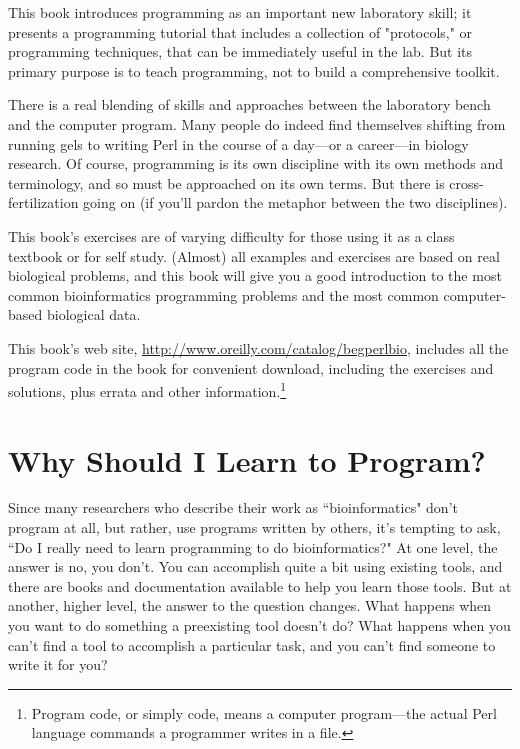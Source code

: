 This book introduces programming as an important new laboratory skill; it presents a programming tutorial that includes a collection of "protocols," or programming techniques, that can be immediately useful in the lab. But its primary purpose is to teach programming, not to build a comprehensive toolkit.

There is a real blending of skills and approaches between the laboratory bench and the computer program. Many people do indeed find themselves shifting from running gels to writing Perl in the course of a day—or a career—in biology research. Of course, programming is its own discipline with its own methods and terminology, and so must be approached on its own terms. But there is cross-fertilization going on (if you'll pardon the metaphor between the two disciplines).

This book's exercises are of varying difficulty for those using it as a class textbook or for self study. (Almost) all examples and exercises are based on real biological problems, and this book will give you a good introduction to the most common bioinformatics programming problems and the most common computer-based biological data.

This book's web site, \href{http://www.oreilly.com/catalog/begperlbio}{http://www.oreilly.com/catalog/begperlbio}, includes all the program code in the book for convenient download, including the exercises and solutions, plus errata and other information.\footnote{Program code, or simply code, means a computer program—the actual Perl language commands a programmer writes in a file.}

\section*{Why Should I Learn to Program?}
Since many researchers who describe their work as ``bioinformatics" don't program at all, but rather, use programs written by others, it's tempting to ask, ``Do I really need to learn programming to do bioinformatics?" At one level, the answer is no, you don't. You can accomplish quite a bit using existing tools, and there are books and documentation available to help you learn those tools. But at another, higher level, the answer to the question changes. What happens when you want to do something a preexisting tool doesn't do? What happens when you can't find a tool to accomplish a particular task, and you can't find someone to write it for you?


